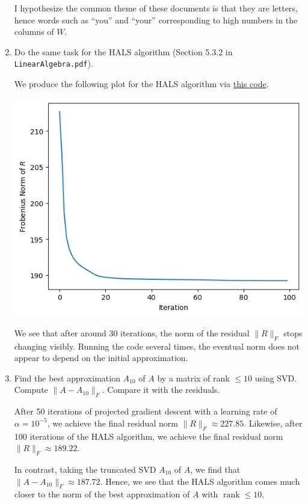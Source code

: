 \documentclass{../../../kin_math}
\begin{document}
\begin{questions}
\begin{enumerate}
\begin{solution}
      I hypothesize the common theme of these documents is that they are letters, hence words such as ``you'' and ``your'' corresponding to high numbers in the columns of $W$.
    \end{solution}
    \newpage
    \item Do the same task for the HALS algorithm (Section 5.3.2 in \texttt{LinearAlgebra.pdf}).
    \begin{solution}
      We produce the following plot for the HALS algorithm via \href{https://github.com/elijahkin/school/blob/main/umd/amsc660/hw6/hw6.ipynb}{this code}.
      \begin{center}
        \includegraphics[scale=0.7]{hals.png}
      \end{center}
      We see that after around 30 iterations, the norm of the residual $\lVert R \rVert_F$ stops changing visibly. Running the code several times, the eventual norm does not appear to depend on the initial approximation.
    \end{solution}
    \item Find the best approximation $A_{10}$ of $A$ by a matrix of rank $\leq 10$ using SVD. Compute $\lVert A - A_{10} \rVert_F$. Compare it with the residuals.
    \begin{solution}
      After 50 iterations of projected gradient descent with a learning rate of $\alpha = 10^{-5}$, we achieve the final residual norm $\lVert R \rVert_F \approx 227.85$. Likewise, after 100 iterations of the HALS algorithm, we achieve the final residual norm $\lVert R \rVert_F \approx 189.22$.

      In contrast, taking the truncated SVD $A_{10}$ of $A$, we find that $\lVert A - A_{10} \rVert_F \approx 187.72$. Hence, we see that the HALS algorithm comes much closer to the norm of the best approximation of $A$ with $\operatorname{rank} \leq 10$.
    \end{solution}
  \end{enumerate}
\end{questions}
\end{document}
